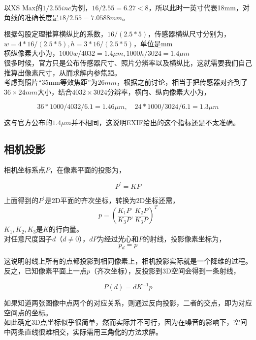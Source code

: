 	以XS Max的$1/2.55inc$为例，$16/2.55 = 6.27 < 8$，所以此时一英寸代表18mm，对角线的准确长度是$18/2.55 = 7.0588mm$。

	根据勾股定理推算横纵比的系数，$16/(2.5*5)$，传感器横纵尺寸分别为，$w = 4*16/(2.5*5), h = 3 *16/(2.5*5)$，单位是mm\\

	横纵像素大小为，$1000w/4032 = 1.4\mu m, 1000h/3024 = 1.4\mu m$\\

	很多时候，官方只是公布传感器尺寸、照片分辨率以及横纵比，这就需要我们自己推算出像素尺寸，从而求解内参焦距。\\

	考虑到照片“35mm等效焦距”为$26mm$，根据之前讨论，相当于把传感器对齐到了$36 \times 24mm$大小，结合$4032 \times 3024$分辨率，横向、纵向像素大小为，

	$$
		36 *1000/4032/ 6.1 = 1.46\mu m, \quad 24*1000/3024/6.1 = 1.3\mu m
	$$

	这与官方公布的$1.4\mu m$并不相同，这说明EXIF给出的这个指标还是不太准确。


\subsection{相机投影}
	相机坐标系点$P$，在像素平面的投影为，

	$$
		P^{\prime}  = KP
	$$

	上面得到的$P^{\prime}$是2D平面的齐次坐标，转换为2D坐标还需，
	$$
		p = \left(\frac{K_1P}{K_3P}, \frac{K_2P}{K_3P}\right)^T
	$$
	$K_1,K_2,K_3$是$K$的行向量。\\

	对任意尺度因子$d$（$d\neq 0$），$dP$为经过光心和$P$的射线，投影像素坐标为，
	$$
		p_d = p
	$$

	这说明射线上所有的点都投影到相同像素上，相机投影实际就是一个降维的过程。\\

	反之，已知像素平面上一点$p$（齐次坐标），反投影到3D空间会得到一条射线，

	\begin{equation}
		P(d) = dK^{-1}p \label{inverse_proj}
	\end{equation}

	如果知道两张图像中点两个的对应关系，则通过反向投影，二者的交点，即为对应空间点的坐标。\\

	如此确定3D点坐标似乎很简单，然而实际并不可行，因为在噪音的影响下，空间中两条直线很难相交，实际需用\textbf{三角化}的方法求解。


